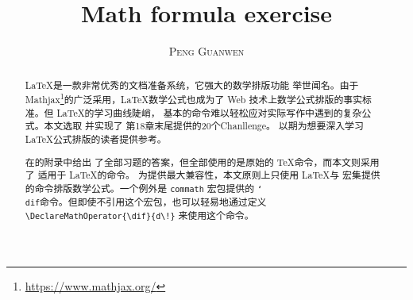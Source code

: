 \documentclass[UTF8,a4paper,scheme=plain,%
punct=quanjiao]{ctexart}
\title{Math formula exercise}
\author{\textsc{Peng Guanwen}}
\newcommand*{\cmd}[1]{\texttt{\char`\\#1}}
\begin{document}
\maketitle

\begin{abstract}
\LaTeX 是一款非常优秀的文档准备系统，它强大的数学排版功能
举世闻名。由于 Mathjax\footnote{\url{https://www.mathjax.org/}}的广泛采用，\LaTeX 数学公式也成为了
Web 技术上数学公式排版的事实标准。但 \LaTeX 的学习曲线陡峭，
基本的命令难以轻松应对实际写作中遇到的复杂公式。本文选取
并实现了 第18章末尾提供的20个Chanllenge。
以期为想要深入学习 \LaTeX 公式排版的读者提供参考。

\citeauthor{TeXbook}在的附录中给出
了全部习题的答案，但全部使用的是原始的 \TeX 命令，而本文则采用了
适用于 \LaTeX 的命令。
为提供最大兼容性，本文原则上只使用 \LaTeX 与 \AmS 宏集提供
的命令排版数学公式。一个例外是 \texttt{commath} 宏包提供的
\cmd{dif}命令。但即使不引用这个宏包，也可以轻易地通过定义
\verb|\DeclareMathOperator{\dif}{d\!}|
来使用这个命令。

\end{abstract}
\end{document}
